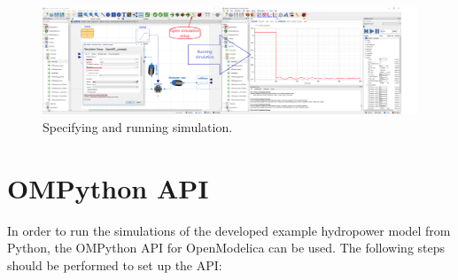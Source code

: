 \documentclass[%
]{USN-PhD}
\begin{document}
\begin{enumerate}
    \begin{figure}[ht]
    \begin{center}
    \includegraphics[width=1\textwidth]{fig/Exam_6} %
    \caption{Specifying and running simulation.}
    \label{fig:fig20}
    \end{center}
    \end{figure}
\end{enumerate}

\section{OMPython API}

In order to run the simulations of the developed example hydropower model from Python, the OMPython API for OpenModelica can be used. The following steps should be performed to set up the API:
\end{document}
